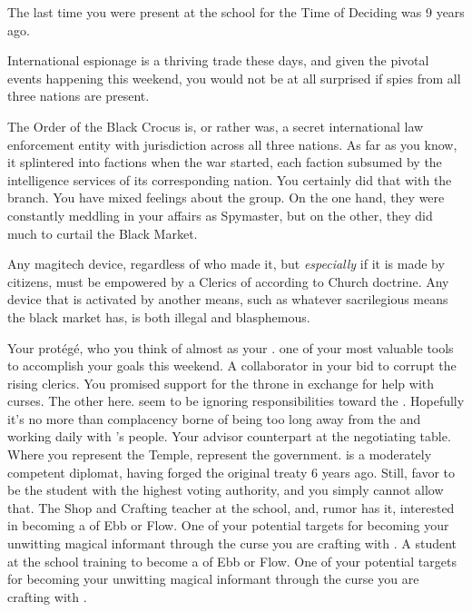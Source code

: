 \documentclass[char]{GL2020}
\begin{document}
\begin{itemz}[Notes]
	\item The last time you were present at the school for the Time of Deciding was 9 years ago.
	\item International espionage is a thriving trade these days, and given the pivotal events happening this weekend, you would not be at all surprised if spies from all three nations are present. 
	\item The Order of the Black Crocus is, or rather was, a secret international law enforcement entity with jurisdiction across all three nations. As far as you know, it splintered into factions when the war started, each faction subsumed by the intelligence services of its corresponding nation. You certainly did that with the \pTech{} branch. You have mixed feelings about the group. On the one hand, they were constantly meddling in your affairs as Spymaster, but on the other, they did much to curtail the Black Market.
	\item Any magitech device, regardless of who made it, but \emph{especially} if it is made by \pTech{} citizens, must be empowered by a Clerics of \cTechGod{} according to Church doctrine. Any device that is activated by another means, such as whatever sacrilegious means the black market has, is both illegal and blasphemous. 
\end{itemz}

\begin{contacts}
	\contact{\cScholarship{}} Your protégé, who you think of almost as your \cScholarship{\child}. \cScholarship{\They} \cScholarship{\are} one of your most valuable tools to accomplish your goals this weekend.
            \contact{\cPrince{}} A collaborator in your bid to corrupt the rising \pShip{} clerics. You promised support for the throne in exchange for \cPrince{\their} help with curses.
	\contact{\cBeetle{}} The other \pTech{} \cBeetle{\cleric} here. \cBeetle{\They} seem\cBeetle{\plural} to be ignoring \cBeetle{\their} responsibilities toward the \pTech{}. Hopefully it's no more than complacency borne of being too long away from the \pTech{} and working daily with \cTechGod{}'s people.
	\contact{\cDiplomat{}} Your advisor counterpart at the negotiating table. Where you represent the Temple, \cDiplomat{\they} represent\cDiplomat{\plural} the government. \cDiplomat{} is a moderately competent diplomat, having forged the original treaty 6 years ago. Still, \cDiplomat{\they} favor \cHeir{} to be the student with the highest voting authority, and you simply cannot allow that.
	\contact{\cPirate{}} The Shop and Crafting teacher at the school, and, rumor has it, interested in becoming a \cPirate{\cleric} of Ebb or Flow. One of your potential targets for becoming your unwitting magical informant through the curse you are crafting with \cPrince{}.
	\contact{\cInitiate{}} A student at the school training to become a \cInitiate{\cleric} of Ebb or Flow. One of your potential targets for becoming your unwitting magical informant through the curse you are crafting with \cPrince{}.
\end{contacts}
\end{document}
